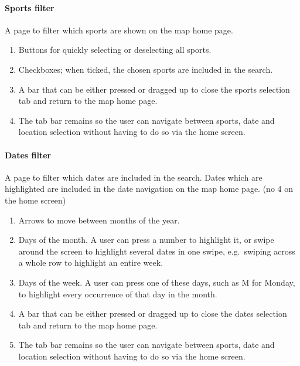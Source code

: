 \paragraph{Sports filter}
A page to filter which sports are shown on the map home page.

\begin{enumerate}
	\item Buttons for quickly selecting or deselecting all sports.
	\item Checkboxes; when ticked, the chosen sports are included in the
		search.
	\item A bar that can be either pressed or dragged up to close the sports
		selection tab and return to the map home page.
	\item The tab bar remains so the user can navigate between sports, date and
		location selection without having to do so via the home screen.
\end{enumerate}

\paragraph{Dates filter}
A page to filter which dates are included in the search. Dates which are
highlighted are included in the date navigation on the map home page. (no 4 on
the home screen)

\begin{enumerate}
	\item Arrows to move between months of the year.
	\item Days of the month. A user can press a number to highlight it, or
		swipe around the screen to highlight several dates in one swipe, e.g.\
		swiping across a whole row to highlight an entire week.
	\item Days of the week. A user can press one of these days, such as M for
		Monday, to highlight every occurrence of that day in the month.
	\item A bar that can be either pressed or dragged up to close the dates
		selection tab and return to the map home page.
	\item The tab bar remains so the user can navigate between sports, date and
		location selection without having to do so via the home screen.
\end{enumerate}

